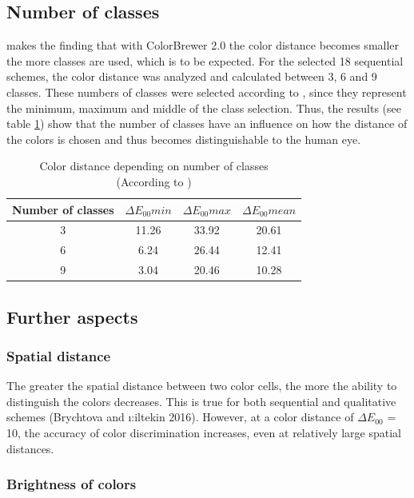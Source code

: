 \subsection{Number of classes}
\textcite{brychtova2017} makes the finding that with ColorBrewer 2.0 the color distance becomes smaller the more classes are used, which is to be expected. For the selected 18 sequential schemes, the color distance was analyzed and calculated between 3, 6 and 9 classes. These numbers of classes were selected according to \textcite{brychtova2017}, since they represent the minimum, maximum and middle of the class selection. Thus, the results (see table \ref{tab:classes}) show that the number of classes have an influence on how the distance of the colors is chosen and thus becomes distinguishable to the human eye. 

\begin{table}[h!]
\centering
\caption[Color distance depending on number of classes]{Color distance depending on number of classes \\ (According to \textcite{brychtova2017})}
	\begin{tabular}{c c c c }
		\hline
		\hline
		Number of classes & $\Delta E_{00}min$ & $\Delta E_{00}max$ & $\Delta E_{00}mean$ \\ 
		\hline
		\hline
		3 & 11.26 & 33.92 & 20.61 \\  
		6 & 6.24 & 26.44 & 12.41 \\
		9 & 3.04 & 20.46 & 10.28   
	\end{tabular}
\label{tab:classes}
\end{table}

\subsection{Further aspects}

\subsubsection{Spatial distance}
The greater the spatial distance between two color cells, the more the ability to distinguish the colors decreases. This is true for both sequential and qualitative schemes (Brychtova and \i:iltekin 2016). However, at a color distance of $\Delta E_{00}$ = 10, the accuracy of color discrimination increases, even at relatively large spatial distances. 

\subsubsection{Brightness of colors}

